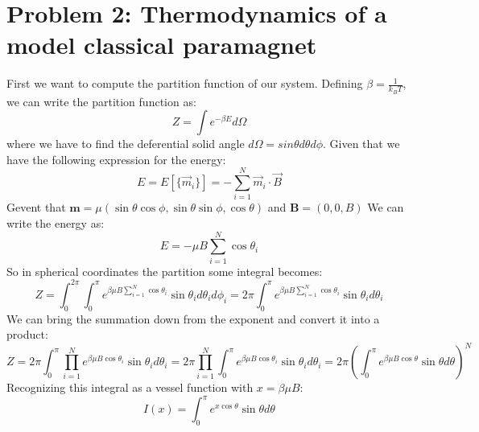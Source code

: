 \documentclass{article}
\begin{document}
\section{Problem 2: Thermodynamics of a model classical paramagnet}
First we want to compute the partition function of our system. Defining $\beta = \frac{1}{k_{B} T}$, we can write the partition function as:
\begin{equation}
    Z = \int e^{-\beta E} d \Omega
\end{equation}
where we have to find the deferential solid angle $d \Omega = sin \theta d \theta d \phi$.
Given that we have the following expression for the energy:
\begin{equation}
    E = E[\{\vec{m}_i\}] = -\sum_{i=1}^{N} \vec{m}_i \cdot \vec{B}
\end{equation}
Gevent that  $\mathbf{m} = \mu(\sin \theta \cos \phi, \sin \theta \sin \phi, \cos \theta)$ and $\mathbf{B} = (0, 0, B)$
We can write the energy as:
\begin{equation}
    E = -\mu B \sum_{i=1}^{N} \cos \theta_{i}
\end{equation}
So in spherical coordinates the partition some integral becomes:
\begin{equation}
    Z = \int_{0}^{2 \pi} \int_{0}^{\pi} e^{\beta \mu B \sum_{i=1}^{N} \cos \theta_{i}} \sin \theta_{i} d \theta_{i} d \phi_{i} = 2 \pi \int_{0}^{\pi} e^{\beta \mu B \sum_{i=1}^{N} \cos \theta_{i}} \sin \theta_{i} d \theta_{i}
\end{equation}
We can bring the summation down from the exponent and convert it into a product:
\begin{equation}
    Z = 2 \pi \int_{0}^{\pi} \prod_{i=1}^{N} e^{\beta \mu B \cos \theta_{i}} \sin \theta_{i} d \theta_{i} = 2 \pi \prod_{i=1}^{N} \int_{0}^{\pi} e^{\beta \mu B \cos \theta_{i}} \sin \theta_{i} d \theta_{i} = 2 \pi \left( \int_{0}^{\pi} e^{\beta \mu B \cos \theta} \sin \theta d \theta \right)^{N}
\end{equation}
Recognizing this integral as a vessel function with $x = \beta \mu B$:
\begin{equation}
    I (x) = \int_{0}^{\pi} e^{x \cos \theta} \sin \theta d \theta 
\end{equation}
\end{document}
